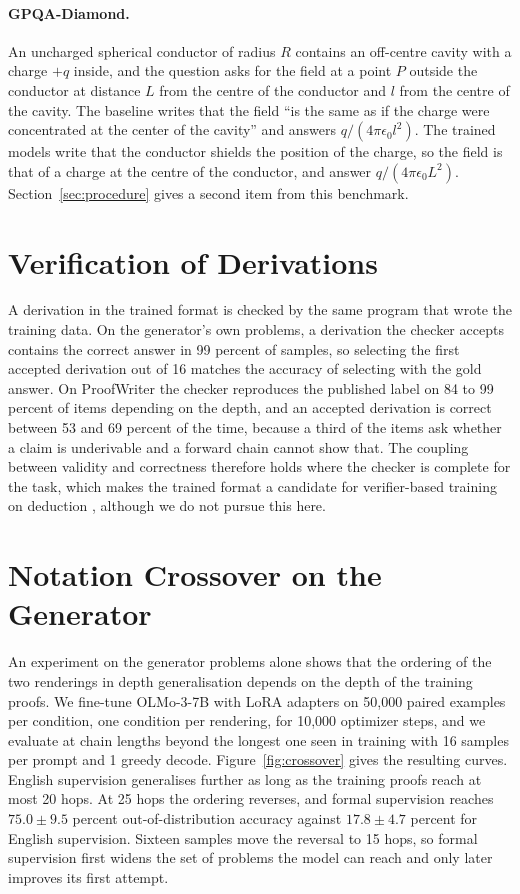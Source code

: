 \paragraph{GPQA-Diamond.} An uncharged spherical conductor of radius $R$
contains an off-centre cavity with a charge $+q$ inside, and the question
asks for the field at a point $P$ outside the conductor at distance $L$ from
the centre of the conductor and $l$ from the centre of the cavity. The
baseline writes that the field ``is the same as if the charge were
concentrated at the center of the cavity'' and answers $q/(4\pi\epsilon_0
l^2)$. The trained models write that the conductor shields the position of
the charge, so the field is that of a charge at the centre of the conductor,
and answer $q/(4\pi\epsilon_0 L^2)$. 
Section~\ref{sec:procedure} gives a second item from this benchmark.

\section{Verification of Derivations}
\label{sec:verification}

A derivation in the trained format is
checked by the same program that wrote the training data. On the generator's
own problems, a derivation the checker accepts contains the correct answer in
99 percent of samples, so selecting the first accepted derivation out of
16 matches the accuracy of selecting with the gold answer. On
ProofWriter the checker reproduces the published label on 84 to 99 percent
of items depending on the depth, and an accepted derivation is correct
between 53 and 69 percent of the time, because a third of the items ask
whether a claim is underivable and a forward chain cannot show that. The
coupling between validity and correctness therefore holds where the checker
is complete for the task, which makes the trained format a candidate for
verifier-based training on deduction \citep{lambert2025tulu, yue2025does},
although we do not pursue this here.

\section{Notation Crossover on the Generator}
\label{sec:crossover}

An experiment on the generator problems alone shows that the ordering of the two
renderings in depth generalisation depends on the depth of the training
proofs. We fine-tune OLMo-3-7B with LoRA adapters on 50{,}000 paired
examples per condition, one condition per rendering, for 10{,}000 optimizer
steps, and we evaluate at chain lengths beyond the longest one seen in
training with 16 samples per prompt and 1 greedy decode.
Figure~\ref{fig:crossover} gives the resulting curves. English supervision
generalises further as long as the training proofs reach at most 20 hops. At
25 hops the ordering reverses, and formal supervision reaches $75.0\pm9.5$
percent out-of-distribution accuracy against $17.8\pm4.7$ percent for English
supervision. Sixteen samples move the reversal to 15 hops, so formal
supervision first widens the set of problems the model can reach and only
later improves its first attempt.

